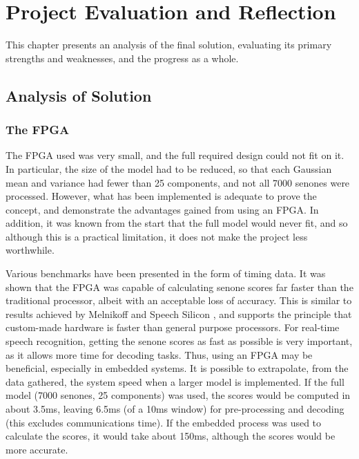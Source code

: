 \chapter{Project Evaluation and Reflection} %
\label{cha:project_analysis}

This chapter presents an analysis of the final solution, evaluating its primary strengths and weaknesses, and the progress as a whole.

\section{Analysis of Solution} %
\label{sec:analysis_of_solution}

	\subsection{The FPGA} %
	\label{sub:analysis_the_fpga}
		The FPGA used was very small, and the full required design could not fit on it.  In particular, the size of the model had to be reduced, so that each Gaussian mean and variance had fewer than 25 components, and not all 7000 senones were processed.  However, what has been implemented is adequate to prove the concept, and demonstrate the advantages gained from using an FPGA.  In addition, it was known from the start that the full model would never fit, and so although this is a practical limitation, it does not make the project less worthwhile.

		Various benchmarks have been presented in the form of timing data.  It was shown that the FPGA was capable of calculating senone scores far faster than the traditional processor, albeit with an acceptable loss of accuracy.  This is similar to results achieved by Melnikoff \cite{melnikoff2003speech} and Speech Silicon \cite{schuster2006speech}, and supports the principle that custom-made hardware is faster than general purpose processors.  For real-time speech recognition, getting the senone scores as fast as possible is very important, as it allows more time for decoding tasks.  Thus, using an FPGA may be beneficial, especially in embedded systems.  It is possible to extrapolate, from the data gathered, the system speed when a larger model is implemented.  If the full model (7000 senones, 25 components) was used, the scores would be computed in about 3.5ms, leaving 6.5ms (of a 10ms window) for pre-processing and decoding (this excludes communications time).  If the embedded process was used to calculate the scores, it would take about 150ms, although the scores would be more accurate.

